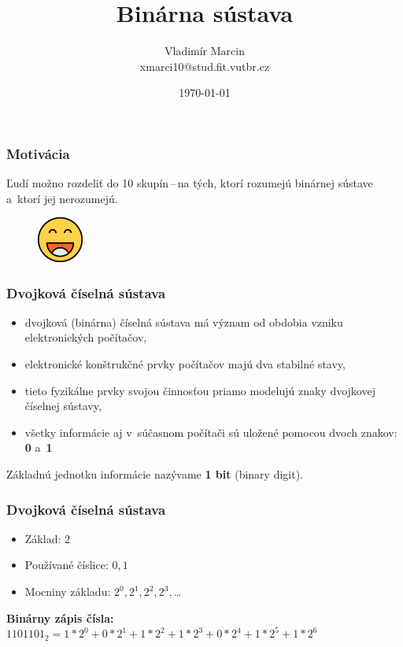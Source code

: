 \documentclass[pdf,slideColor,fyma]{beamer}
\title{Binárna sústava}
\author{Vladimír Marcin \\ 
		{\footnotesize xmarci10@stud.fit.vutbr.cz}}
\institute{Fakulta informačních technologií \\ 
						 Vysoké učení technické v~Brně}
\date{\today}
\begin{document}
\begin{frame}
	\titlepage
\end{frame}

\begin{frame}
\frametitle{Motivácia}
Ľudí možno rozdeliť do 10 skupín\,--\,na tých, ktorí rozumejú
binárnej sústave a~ktorí jej nerozumejú.
\medskip
\begin{figure}[h]
	\includegraphics[height=1.5cm]{smile.png}
	\centering
\end{figure}
\end{frame}

\begin{frame}
\frametitle{Dvojková číselná sústava}
	\begin{itemize}
		\item dvojková (binárna) číselná sústava má význam od obdobia vzniku elektronických počítačov,
		\item elektronické konštrukčné prvky počítačov majú dva stabilné stavy,
		\item tieto fyzikálne prvky svojou činnosťou priamo modelujú znaky dvojkovej číselnej sústavy,
		\item všetky informácie aj v~súčasnom počítači sú uložené pomocou dvoch znakov: \textbf{0} a~\textbf{1}
	\end{itemize}
\medskip
\large{Základnú jednotku informácie nazývame \textbf{1 bit} (binary digit).}
\end{frame}

\begin{frame}
\frametitle{Dvojková číselná sústava}
\begin{itemize}
	\item Základ:\hspace{5.1em} $2$
	\item Používané číslice:\hspace{1em} $0, 1$
	\item Mocniny základu:\hspace{1em} $2^0, 2^1, 2^2, 2^3,$\dots
\end{itemize}
\medskip
\textbf{Binárny zápis čísla:}\\
\medskip
$1101101_2=1*2^0+0*2^1+1*2^2+1*2^3+0*2^4+1*2^5+1*2^6$
\end{frame}
\end{document}
